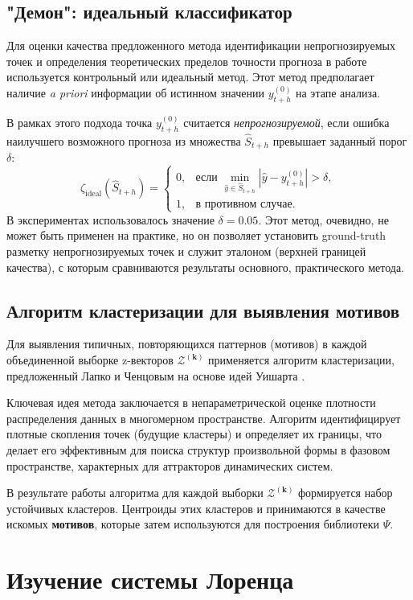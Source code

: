 \documentclass[a4paper,12pt]{extarticle}
\begin{document}
\subsection{"Демон": идеальный классификатор}

Для оценки качества предложенного метода идентификации непрогнозируемых точек и
определения теоретических пределов точности прогноза в работе используется
контрольный или идеальный метод. Этот метод предполагает наличие \textit{a priori}
 информации об истинном значении $y_{t+h}^{(0)}$ на этапе анализа.

В рамках этого подхода точка $y_{t+h}^{(0)}$ считается \textit{непрогнозируемой},
 если ошибка наилучшего возможного прогноза из множества $\hat{S}_{t+h}$ превышает заданный порог $\delta$:
\[
\zeta_{\text{ideal}}(\hat{S}_{t+h}) =
\begin{cases}
0, & \text{если } \min_{\hat{y} \in \hat{S}_{t+h}} |\hat{y} - y_{t+h}^{(0)}| > \delta, \\
1, & \text{в противном случае.}
\end{cases}
\]
В экспериментах использовалось значение $\delta = 0.05$. Этот метод,
 очевидно, не может быть применен на практике, но он позволяет установить ground-truth
  разметку непрогнозируемых точек и служит эталоном (верхней границей качества),
   с которым сравниваются результаты основного, практического метода.
\subsection{Алгоритм кластеризации для выявления мотивов}

Для выявления типичных, повторяющихся паттернов (мотивов) в каждой
объединенной выборке z-векторов $\mathcal{Z}^{(\boldsymbol{k})}$ применяется
алгоритм кластеризации, предложенный Лапко и Ченцовым на основе идей
Уишарта \cite{GromovBaranov2023}.

Ключевая идея метода заключается в непараметрической оценке плотности
распределения данных в многомерном пространстве. Алгоритм идентифицирует
плотные скопления точек (будущие кластеры) и определяет их границы,
что делает его эффективным для поиска структур произвольной формы
в фазовом пространстве, характерных для аттракторов динамических систем.

В результате работы алгоритма для каждой выборки $\mathcal{Z}^{(\boldsymbol{k})}$
формируется набор устойчивых кластеров. Центроиды этих кластеров
и принимаются в качестве искомых \textbf{мотивов}, которые затем используются
для построения библиотеки $\Psi$.
\section{Изучение системы Лоренца}
\end{document}
